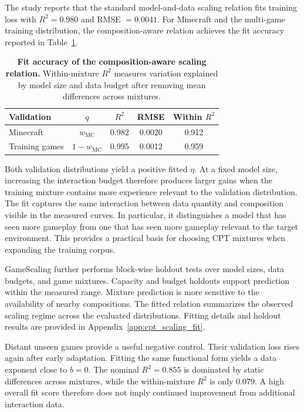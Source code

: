 The study reports that the standard model-and-data scaling relation fits training loss with $R^2=0.980$ and RMSE $=0.0041$.
For Minecraft and the multi-game training distribution, the composition-aware relation achieves the fit accuracy reported in Table~\ref{tab:scaling_fit}.

\begin{table}[t]
    \centering
    \small
    \setlength{\tabcolsep}{4pt}
    \begin{tabular}{lcccc}
        \toprule
        \textbf{Validation}
        & \textbf{$q$}
        & \textbf{$R^2$}
        & \textbf{RMSE}
        & \textbf{Within $R^2$} \\
        \midrule
        Minecraft
        & $w_{\mathrm{MC}}$
        & 0.982
        & 0.0020
        & 0.912 \\
        
        Training games
        & $1-w_{\mathrm{MC}}$
        & 0.995
        & 0.0012
        & 0.959 \\
        \bottomrule
    \end{tabular}
    \caption{
    \textbf{Fit accuracy of the composition-aware scaling relation.}
    Within-mixture $R^2$ measures variation explained by model size and data budget after removing mean differences across mixtures.
    }
    \label{tab:scaling_fit}
\end{table}

Both validation distributions yield a positive fitted $\eta$. At a fixed model size, increasing the interaction budget therefore produces larger gains when the training mixture contains more experience relevant to the validation distribution. The fit captures the same interaction between data quantity and composition visible in the measured curves. In particular, it distinguishes a model that has seen more gameplay from one that has seen more gameplay relevant to the target environment. This provides a practical basis for choosing CPT mixtures when expanding the training corpus.

GameScaling further performs block-wise holdout tests over model sizes, data budgets, and game mixtures.
Capacity and budget holdouts support prediction within the measured range.
Mixture prediction is more sensitive to the availability of nearby compositions.
The fitted relation summarizes the observed scaling regime across the evaluated distributions.
Fitting details and holdout results are provided in Appendix~\ref{app:cpt_scaling_fit}.

Distant unseen games provide a useful negative control.
Their validation loss rises again after early adaptation.
Fitting the same functional form yields a data exponent close to $b=0$.
The nominal $R^2=0.855$ is dominated by static differences across mixtures, while the within-mixture $R^2$ is only 0.079.
A high overall fit score therefore does not imply continued improvement from additional interaction data.


